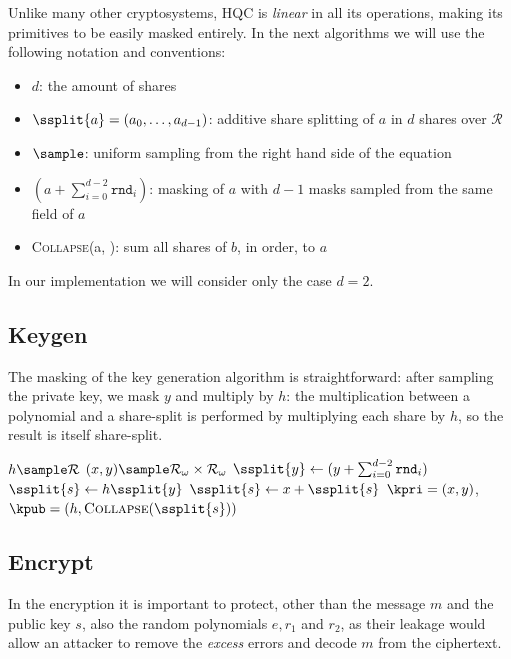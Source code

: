     Unlike many other cryptosystems, HQC is \textit{linear} in all its operations, making its primitives to be easily masked entirely.
    In the next algorithms we will use the following notation and conventions:
    \begin{itemize}
        \item $d$: the amount of shares
        \item $\ssplit{a} = (a_0,\ldots,a_{d-1})$: additive share splitting of $a$ in $d$ shares over $\mathcal{R}$
        \item $\sample$: uniform sampling from the right hand side of the equation
        \item $(a+\sum_{i=0}^{d-2} \mathtt{rnd}_i)$: masking of $a$ with $d-1$ masks sampled from the same field of $a$
        \item \textsc{Collapse}(a, ): sum all shares of $b$, in order, to $a$
    \end{itemize}
    In our implementation we will consider only the case $d=2$.

    \subsection{Keygen}
    The masking of the key generation algorithm is straightforward: after sampling the private key, we mask $y$ and multiply 
    by $h$: the multiplication between a polynomial and a share-split is performed by multiplying each share by $h$, so the result is
    itself share-split.\\
    \begin{algorithm2e}[H]
        \caption{Keygen}
        $h \sample \mathcal{R}$\;
        $(x,y) \sample \mathcal{R}_\omega \times \mathcal{R}_\omega$\;
        $\ssplit{y} \gets (y+\sum_{i=0}^{d-2} \mathtt{rnd}_i)$\;
        $\ssplit{s} \gets h \ssplit{y}$\;
        $\ssplit{s} \gets x + \ssplit{s}$
        \KwRet $\kpri=(x,y)$, $\kpub = (h,\textsc{Collapse}(\ssplit{s}))$\;
        \end{algorithm2e}

    \subsection{Encrypt}
    In the encryption it is important to protect, other than the message $m$ and the public key $s$, also the random polynomials
    $e,r_1$ and $r_2$, as their leakage would allow an attacker to remove the \textit{excess} errors and decode $m$ from the ciphertext.
    
